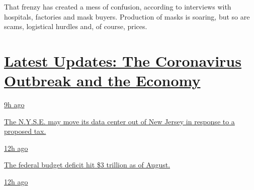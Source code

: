 That frenzy has created a mess of confusion, according to interviews
with hospitals, factories and mask buyers. Production of masks is
soaring, but so are scams, logistical hurdles and, of course, prices.

\hypertarget{latest-updates-the-coronavirus-outbreak-and-the-economy}{%
\section{\texorpdfstring{\href{https://www.nytimes3xbfgragh.onion/live/2020/09/11/business/stock-market-today-coronavirus?action=click\&pgtype=Article\&state=default\&region=MAIN_CONTENT_1\&context=storylines_live_updates}{Latest
Updates: The Coronavirus Outbreak and the
Economy}}{Latest Updates: The Coronavirus Outbreak and the Economy}}\label{latest-updates-the-coronavirus-outbreak-and-the-economy}}

\href{https://www.nytimes3xbfgragh.onion/live/2020/09/11/business/stock-market-today-coronavirus?action=click\&pgtype=Article\&state=default\&region=MAIN_CONTENT_1\&context=storylines_live_updates\#the-nyse-may-move-its-data-center-out-of-new-jersey-in-response-to-a-proposed-tax}{9h
ago}

\href{https://www.nytimes3xbfgragh.onion/live/2020/09/11/business/stock-market-today-coronavirus?action=click\&pgtype=Article\&state=default\&region=MAIN_CONTENT_1\&context=storylines_live_updates\#the-nyse-may-move-its-data-center-out-of-new-jersey-in-response-to-a-proposed-tax}{The
N.Y.S.E. may move its data center out of New Jersey in response to a
proposed tax.}

\href{https://www.nytimes3xbfgragh.onion/live/2020/09/11/business/stock-market-today-coronavirus?action=click\&pgtype=Article\&state=default\&region=MAIN_CONTENT_1\&context=storylines_live_updates\#the-federal-budget-deficit-hit-3-trillion-as-of-august}{12h
ago}

\href{https://www.nytimes3xbfgragh.onion/live/2020/09/11/business/stock-market-today-coronavirus?action=click\&pgtype=Article\&state=default\&region=MAIN_CONTENT_1\&context=storylines_live_updates\#the-federal-budget-deficit-hit-3-trillion-as-of-august}{The
federal budget deficit hit \$3 trillion as of August.}

\href{https://www.nytimes3xbfgragh.onion/live/2020/09/11/business/stock-market-today-coronavirus?action=click\&pgtype=Article\&state=default\&region=MAIN_CONTENT_1\&context=storylines_live_updates\#warner-bros-pushes-the-release-of-wonder-woman-1984-to-christmas}{12h
ago}

